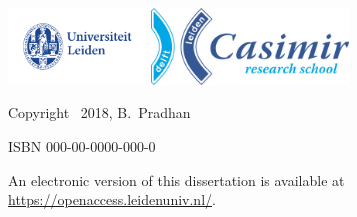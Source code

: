 \begin{titlepage}
\vfill
\begin{center}
    \includegraphics[height=0.8in]{frontback/logos/leiden}
    \hspace{2em}
    \includegraphics[height=0.8in]{frontback/logos/casimir} \\
\end{center}
\vfill

\vspace{4\bigskipamount}

\noindent Copyright \textcopyright\ 2018, B.~Pradhan


\medskip
\noindent ISBN 000-00-0000-000-0

\medskip
\noindent An electronic version of this dissertation is available at \\
\url{https://openaccess.leidenuniv.nl/}.

\end{titlepage}

